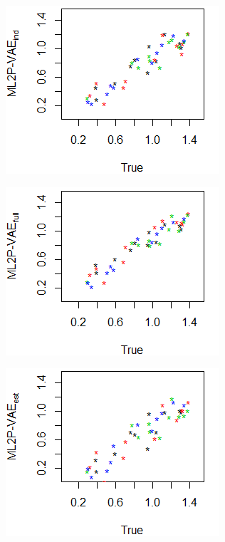 \begin{figure}[h]
\begin{subfigure}{.32\textwidth}
      \includegraphics[width=.9\linewidth]{img/ml_journal_results/4skills/vae_ind_disc_4skills_cropped.png}
    \end{subfigure}
    \begin{subfigure}{.32\textwidth}
      \centering
      \includegraphics[width=.9\linewidth]{img/ml_journal_results/4skills/vae_full_disc_4skills_cropped.png}
    \end{subfigure}
    \begin{subfigure}{.32\textwidth}
      \centering
      \includegraphics[width=.9\linewidth]{img/ml_journal_results/4skills/vae_est_disc_4skills_cropped.png}

\end{subfigure}
\end{figure}
